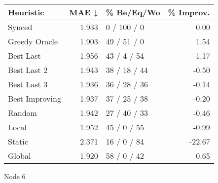 \begin{tabular}{lrlr}
\toprule
\textbf{Heuristic} & \textbf{MAE ↓} & \textbf{\% Be/Eq/Wo} & \textbf{\% Improv.} \\
\midrule
            Synced &          1.933 &          0 / 100 / 0 &                0.00 \\
     Greedy Oracle &          1.903 &          49 / 51 / 0 &                1.54 \\
         Best Last &          1.956 &          43 / 4 / 54 &               -1.17 \\
       Best Last 2 &          1.943 &         38 / 18 / 44 &               -0.50 \\
       Best Last 3 &          1.936 &         36 / 28 / 36 &               -0.14 \\
    Best Improving &          1.937 &         37 / 25 / 38 &               -0.20 \\
            Random &          1.942 &         27 / 40 / 33 &               -0.46 \\
             Local &          1.952 &          45 / 0 / 55 &               -0.99 \\
            Static &          2.371 &          16 / 0 / 84 &              -22.67 \\
            Global &          1.920 &          58 / 0 / 42 &                0.65 \\
\bottomrule
\end{tabular}
\caption{Node 6}
\label{tab:hr_non_lr01_le2_bs4_6}
